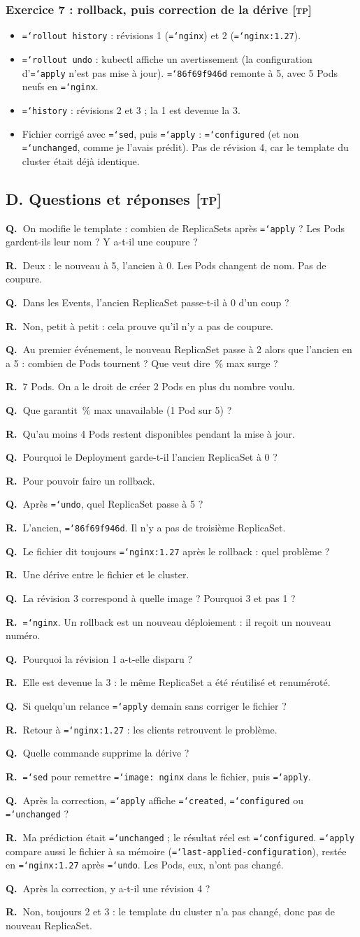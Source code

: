\documentclass[11pt,a4paper]{article}
\newcommand{\cmd}[1]{\texttt{\hyphenchar\font=`\-#1}}
\newcommand{\tp}{\textsc{[tp]}}
\newcommand{\QR}[2]{\needspace{4\baselineskip}\par\noindent\textbf{Q.~}#1\par\nopagebreak\noindent\textbf{R.~}#2\par\medskip}
\newcommand{\partie}[1]{\needspace{9\baselineskip}\subsection*{#1}}
\newcommand{\exo}[1]{\needspace{8\baselineskip}\subsubsection*{#1}}
\begin{document}
\exo{Exercice 7 : rollback, puis correction de la dérive \tp}
\begin{itemize}
  \item \cmd{rollout history} : révisions 1 (\cmd{nginx}) et 2 (\cmd{nginx:1.27}).
  \item \cmd{rollout undo} : kubectl affiche un avertissement (la configuration d'\cmd{apply} n'est pas mise à jour). \cmd{86f69f946d} remonte à 5, avec 5 Pods neufs en \cmd{nginx}.
  \item \cmd{history} : révisions 2 et 3 ; la 1 est devenue la 3.
  \item Fichier corrigé avec \cmd{sed}, puis \cmd{apply} : \cmd{configured} (et non \cmd{unchanged}, comme je l'avais prédit). Pas de révision 4, car le template du cluster était déjà identique.
\end{itemize}

\partie{D. Questions et réponses \tp}
\QR{On modifie le template : combien de ReplicaSets après \cmd{apply} ? Les Pods gardent-ils leur nom ? Y a-t-il une coupure ?}{Deux : le nouveau à 5, l'ancien à 0. Les Pods changent de nom. Pas de coupure.}
\QR{Dans les Events, l'ancien ReplicaSet passe-t-il à 0 d'un coup ?}{Non, petit à petit : cela prouve qu'il n'y a pas de coupure.}
\QR{Au premier événement, le nouveau ReplicaSet passe à 2 alors que l'ancien en a 5 : combien de Pods tournent ? Que veut dire \og 25\,\% max surge \fg{} ?}{7 Pods. On a le droit de créer 2 Pods en plus du nombre voulu.}
\QR{Que garantit \,\% max unavailable \fg{} (1 Pod sur 5) ?}{Qu'au moins 4 Pods restent disponibles pendant la mise à jour.}
\QR{Pourquoi le Deployment garde-t-il l'ancien ReplicaSet à 0 ?}{Pour pouvoir faire un rollback.}
\QR{Après \cmd{undo}, quel ReplicaSet passe à 5 ?}{L'ancien, \cmd{86f69f946d}. Il n'y a pas de troisième ReplicaSet.}
\QR{Le fichier dit toujours \cmd{nginx:1.27} après le rollback : quel problème ?}{Une dérive entre le fichier et le cluster.}
\QR{La révision 3 correspond à quelle image ? Pourquoi 3 et pas 1 ?}{\cmd{nginx}. Un rollback est un nouveau déploiement : il reçoit un nouveau numéro.}
\QR{Pourquoi la révision 1 a-t-elle disparu ?}{Elle est devenue la 3 : le même ReplicaSet a été réutilisé et renuméroté.}
\QR{Si quelqu'un relance \cmd{apply} demain sans corriger le fichier ?}{Retour à \cmd{nginx:1.27} : les clients retrouvent le problème.}
\QR{Quelle commande supprime la dérive ?}{\cmd{sed} pour remettre \cmd{image: nginx} dans le fichier, puis \cmd{apply}.}
\QR{Après la correction, \cmd{apply} affiche \cmd{created}, \cmd{configured} ou \cmd{unchanged} ?}{Ma prédiction était \cmd{unchanged} ; le résultat réel est \cmd{configured}. \cmd{apply} compare aussi le fichier à sa mémoire (\cmd{last-applied-configuration}), restée en \cmd{nginx:1.27} après \cmd{undo}. Les Pods, eux, n'ont pas changé.}
\QR{Après la correction, y a-t-il une révision 4 ?}{Non, toujours 2 et 3 : le template du cluster n'a pas changé, donc pas de nouveau ReplicaSet.}
\end{document}
